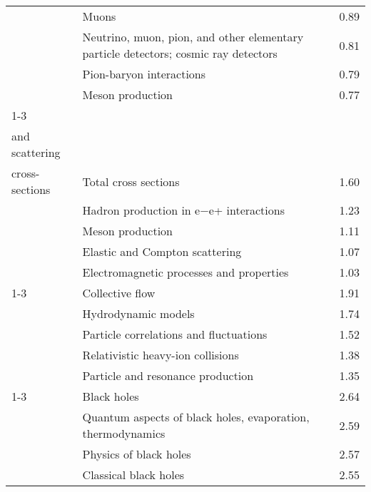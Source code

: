 \begin{longtable}[H]{p{}|p{}|p{}}
                                        & Muons &  0.89 \\
                                        & Neutrino, muon, pion, and other elementary particle detectors; cosmic ray detectors &  0.81 \\
                                        & Pion-baryon interactions &  0.79 \\
                                        & Meson production &  0.77 \\
\cline{1-3}
\multirow{5}{*}{\begin{tabular}{l}Annihilation\\ and scattering\\ cross-sections\end{tabular}} & Total cross sections &  1.60 \\
                                        & Hadron production in e−e+ interactions &  1.23 \\
                                        & Meson production &  1.11 \\
                                        & Elastic and Compton scattering &  1.07 \\
                                        & Electromagnetic processes and properties &  1.03 \\
\cline{1-3}
\multirow{5}{*}{\begin{tabular}{l}Astrophysics\end{tabular}} & Collective flow &  1.91 \\
                                        & Hydrodynamic models &  1.74 \\
                                        & Particle correlations and fluctuations &  1.52 \\
                                        & Relativistic heavy-ion collisions &  1.38 \\
                                        & Particle and resonance production &  1.35 \\
\cline{1-3}
\multirow{5}{*}{\begin{tabular}{l}Black holes\end{tabular}} & Black holes &  2.64 \\
                                        & Quantum aspects of black holes, evaporation, thermodynamics &  2.59 \\
                                        & Physics of black holes &  2.57 \\
                                        & Classical black holes &  2.55 \\

\end{longtable}
